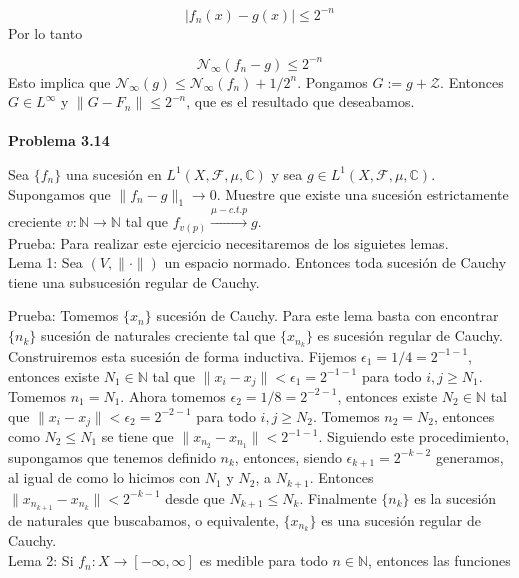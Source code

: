 \documentclass[12pt]{article}
\begin{document}
    \[|f_n(x)-g(x)| \leq 2^{-n}\]
    Por lo tanto 

    \[\mathcal{N}_{\infty}(f_n-g) \leq 2^{-n}\]
    Esto implica que $\mathcal{N}_{\infty}(g) \leq \mathcal{N}_{\infty}(f_n)+1/2^n$. 
    Pongamos $G := g+\mathcal{Z}$. Entonces $G\in L^{\infty}$ y 
    $\|G-F_n\| \leq 2^{-n}$, que es el resultado que deseabamos.
    \\ \\

    \textbf{Problema 3.14}

    Sea $\{f_n\}$ una sucesi\'on en $L^1(X,\mathcal{F},\mu,\mathbb{C})$ y sea 
    $g\in L^1(X,\mathcal{F},\mu,\mathbb{C})$. Supongamos que $\|f_n-g\|_1\rightarrow 0$.
    Muestre que existe una sucesi\'on estrictamente creciente 
    $v:\mathbb{N}\rightarrow \mathbb{N}$ tal que 
    $f_{v(p)}\overset{\mu-c.t.p}{\longrightarrow} g$.
    \\

    Prueba: Para realizar este ejercicio necesitaremos de los siguietes lemas.
    \\

    Lema 1: Sea $(V,\|\cdot\|)$ un espacio normado. Entonces toda sucesi\'on de Cauchy
    tiene una subsucesi\'on regular de Cauchy.

    Prueba: Tomemos $\{x_n\}$ sucesi\'on de Cauchy. Para este lema basta con encontrar 
    $\{n_k\}$ sucesi\'on de naturales creciente tal que $\{x_{n_k}\}$ es sucesi\'on regular 
    de Cauchy. Construiremos esta sucesi\'on de 
    forma inductiva. Fijemos $\epsilon_1 = 1/4 = 2^{-1-1}$, entonces existe 
    $N_1\in \mathbb{N}$ tal que 
    $\|x_{i}-x_{j}\| < \epsilon_1 = 2^{-1-1}$ para todo $i,j \geq N_1$. Tomemos $n_1 = N_1$.
    Ahora tomemos $\epsilon_2 = 1/8 = 2^{-2-1}$, entonces existe $N_2\in \mathbb{N}$ tal que 
    $\|x_{i}-x_{j}\| < \epsilon_2 = 2^{-2-1}$ para todo $i,j \geq N_2$. Tomemos $n_2 = N_2$,
    entonces como $N_2\leq N_1$ se tiene que $\|x_{n_2}-x_{n_1}\| < 2^{-1-1}$. Siguiendo 
    este procedimiento, supongamos que tenemos definido $n_{k}$, entonces, siendo 
    $\epsilon_{k+1} = 2^{-k-2}$ generamos, al igual de como lo hicimos con $N_1$ y $N_2$, 
    a $N_{k+1}$. Entonces $\|x_{n_{k+1}}-x_{n_k}\| < 2^{-k-1}$ desde que $N_{k+1} \leq N_k$.
    Finalmente $\{n_k\}$ es la sucesi\'on de naturales que buscabamos, o equivalente,
    $\{x_{n_k}\}$ es una sucesi\'on regular de Cauchy.
    \\

    Lema 2: Si $f_n:X\rightarrow [-\infty,\infty]$ es medible para todo $n\in \mathbb{N}$,
    entonces las funciones 
\end{document}
